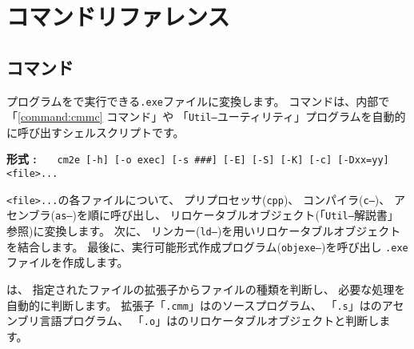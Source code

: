 % 
%
\chapter{コマンドリファレンス}
\label{app:command}


\section{{\cme}コマンド}

{\cmm}プログラムを{\tac}で実行できる{\tt .exe}ファイルに変換します。
{\cme}コマンドは、内部で「\ref{command:cmmc} {\cmmc}コマンド」や
「{\tt Util--}ユーティリティ」プログラムを自動的に呼び出すシェルスクリプトです。

\begin{flushleft}
{\bf 形式 : }~~~\verb/cm2e [-h] [-o exec] [-s ###] [-E] [-S] [-K] [-c] [-Dxx=yy] <file>.../
\end{flushleft}

{\tt <file>...}の各ファイルについて、
プリプロセッサ({\tt cpp})、
コンパイラ({\tt c--})、
アセンブラ({\tt as--})を順に呼び出し、
リロケータブルオブジェクト(「{\tt Util--}解説書」参照)に変換します。
次に、
リンカー({\tt ld--})を用いリロケータブルオブジェクトを結合します。
最後に、実行可能形式作成プログラム({\tt objexe--})を呼び出し
{\tt .exe}ファイルを作成します。

{\cme}は、
指定されたファイルの拡張子からファイルの種類を判断し、
必要な処理を自動的に判断します。
拡張子「{\tt .cmm}」は{\cmml}のソースプログラム、
「{\tt .s}」は{\tac}のアセンブリ言語プログラム、
「{\tt .o}」は{\tac}のリロケータブルオブジェクトと判断します。

